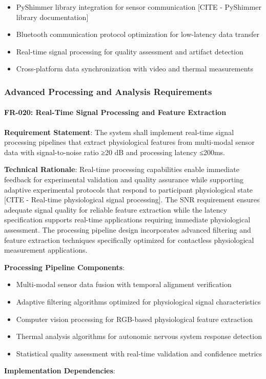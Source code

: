 \documentclass[12pt,a4paper]{report}
\begin{document}
\begin{itemize}
\item PyShimmer library integration for sensor communication [CITE - PyShimmer library documentation]
\item Bluetooth communication protocol optimization for low-latency data transfer
\item Real-time signal processing for quality assessment and artifact detection
\item Cross-platform data synchronization with video and thermal measurements

\end{itemize}
\subsubsection{Advanced Processing and Analysis Requirements}

\paragraph{FR-020: Real-Time Signal Processing and Feature Extraction}

\textbf{Requirement Statement}: The system shall implement real-time signal processing pipelines that extract physiological
features from multi-modal sensor data with signal-to-noise ratio ≥20 dB and processing latency ≤200ms.

\textbf{Technical Rationale}: Real-time processing capabilities enable immediate feedback for experimental validation and
quality assurance while supporting adaptive experimental protocols that respond to participant physiological
state [CITE - Real-time physiological signal processing]. The SNR requirement ensures adequate signal quality for
reliable feature extraction while the latency specification supports real-time applications requiring immediate
physiological assessment. The processing pipeline design incorporates advanced filtering and feature extraction
techniques specifically optimized for contactless physiological measurement applications.

\textbf{Processing Pipeline Components}:

\begin{itemize}
\item Multi-modal sensor data fusion with temporal alignment verification
\item Adaptive filtering algorithms optimized for physiological signal characteristics
\item Computer vision processing for RGB-based physiological feature extraction
\item Thermal analysis algorithms for autonomic nervous system response detection
\item Statistical quality assessment with real-time validation and confidence metrics

\end{itemize}
\textbf{Implementation Dependencies}:
\end{document}
